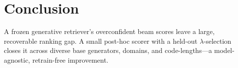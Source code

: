 \documentclass[sigconf,anonymous,review]{acmart}
\begin{document}
\section{Conclusion}
A frozen generative retriever's overconfident beam scores leave a large, recoverable ranking gap. A
small post-hoc scorer with a held-out $\lambda$-selection closes it across diverse base
generators, domains, and code-lengths---a model-agnostic, retrain-free improvement.



\end{document}
